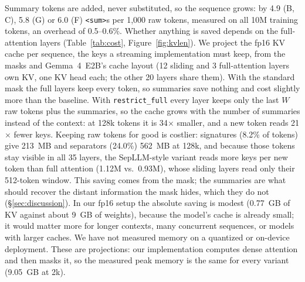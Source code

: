 \documentclass[10pt,twocolumn]{article}
\newcommand{\sumtok}{\texttt{<sum>}}
\begin{document}
Summary tokens are added, never substituted, so the sequence grows: by 4.9
(B, C), 5.8 (G) or 6.0 (F) \sumtok{}s per 1{,}000 raw tokens, measured on all
10M training tokens, an overhead of 0.5--0.6\%. Whether anything is saved
depends on the full-attention layers (Table~\ref{tab:cost},
Figure~\ref{fig:kvlen}). We project the fp16 KV cache per sequence, the keys
a streaming implementation must keep, from the masks and Gemma~4~E2B's cache
layout (12 sliding and 3 full-attention layers own KV, one KV head each; the
other 20 layers share them). With the standard mask the full layers keep
every token, so summaries save nothing and cost slightly more than the
baseline. With \texttt{restrict\_full} every layer keeps only the last $W$
raw tokens plus the summaries, so the cache grows with the number of
summaries instead of the context: at 128k tokens it is 34$\times$ smaller,
and a new token reads 21$\times$ fewer keys. Keeping raw tokens for good is
costlier: signatures (8.2\% of tokens) give 213~MB and separators (24.0\%)
562~MB at 128k, and because those tokens stay visible in all 35 layers,
the SepLLM-style variant reads more keys per new token than full attention
(1.12M vs.\ 0.93M), whose sliding layers read only their 512-token window.
This saving comes from the mask; the summaries are what should recover the
distant information the mask hides, which they do not
(\S\ref{sec:discussion}). In our fp16
setup the absolute saving is modest (0.77~GB of KV against about 9~GB of
weights), because the model's cache is already small; it would matter more
for longer contexts, many concurrent sequences, or models with larger
caches. We have not measured memory on a quantized or on-device deployment. These are
projections: our implementation computes dense attention and then masks it,
so the measured peak memory is the same for every variant (9.05~GB at 2k).
\end{document}
